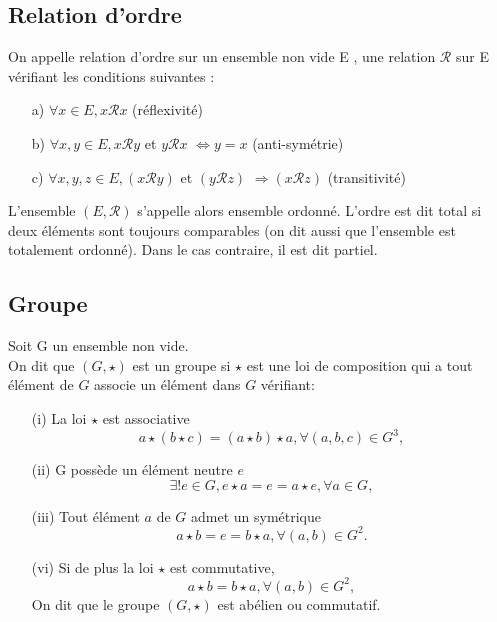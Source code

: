 \subsection{Relation d'ordre}
\begin{madefinition}
	On appelle relation d’ordre sur un ensemble non vide E , une relation
	$\mathcal{R}$ sur E vérifiant les conditions suivantes :
	\begin{enumerate}
		\item[a) ] $\forall x \in E, x\mathcal{R}x$ (réflexivité)
		\item[b) ] $\forall x,y \in E, x\mathcal{R}y $ et $y\mathcal{R}x$ $ \Longleftrightarrow y = x $ (anti-symétrie)
		\item[c) ] $\forall x,y,z \in E, (x\mathcal{R}y)$ et $(y\mathcal{R}z)$ $\Longrightarrow (x\mathcal{R}z)$  (transitivité)
	\end{enumerate}
	L'ensemble $(E, \mathcal{R})$ s'appelle alors ensemble ordonné. L'ordre est dit total si deux éléments sont toujours comparables (on dit aussi que l'ensemble est totalement ordonné). Dans le cas contraire, il est dit partiel.
\end{madefinition}

\subsection{Groupe}
\begin{madefinition}
	Soit G un ensemble non vide.\\
	On dit que $(G, \star)$ est un groupe si $\star$ est une loi de composition qui a tout élément de $G$ associe un élément dans $G$ vérifiant:
	\begin{enumerate}
		\item[(i)] La loi $\star$ est associative 
		\[ a\star(b\star c) = (a\star b) \star a, \forall (a,b,c) \in G^3,\]
		\item[(ii)] G possède un élément neutre $e$
		\[ \exists!e \in G, e\star a = e =  a\star e, \forall a \in G,\]
		\item[(iii)] Tout élément $a$ de $G$ admet un symétrique
		\[ a\star b = e = b \star a, \forall (a,b) \in G^2.\]
		\item [(vi)] Si de plus la loi $\star$ est commutative, 
		\[ a\star b = b \star a, \forall (a,b) \in G^2,\]
		On dit que le groupe $(G,\star)$ est abélien ou commutatif.
	\end{enumerate}
\end{madefinition}
